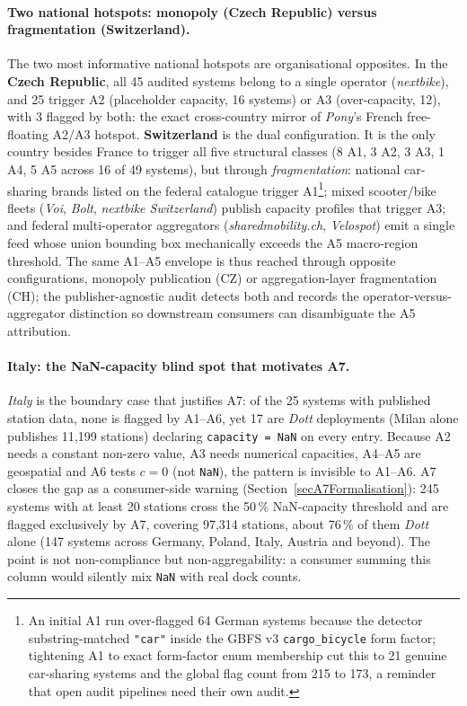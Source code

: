 \documentclass[11pt,a4paper]{article}
\begin{document}


\paragraph{Two national hotspots: monopoly (Czech Republic) versus fragmentation (Switzerland).}
The two most informative national hotspots are organisational
opposites. In the \textbf{Czech Republic}, all 45 audited systems
belong to a single operator (\emph{nextbike}), and 25 trigger A2
(placeholder capacity, 16 systems) or A3 (over-capacity, 12), with 3
flagged by both: the exact cross-country mirror of \emph{Pony}'s
French free-floating A2/A3 hotspot. \textbf{Switzerland} is the dual
configuration. It is the only country besides France to trigger all
five structural classes (8 A1, 3 A2, 3 A3, 1 A4, 5 A5 across 16 of 49
systems), but through \emph{fragmentation}: national car-sharing
brands listed on the federal catalogue trigger A1\footnote{An initial
A1 run over-flagged 64 German systems because the detector
substring-matched \texttt{"car"} inside the GBFS v3
\texttt{cargo\_bicycle} form factor; tightening A1 to exact
form-factor enum membership cut this to 21 genuine car-sharing systems
and the global flag count from 215 to 173, a reminder that open audit
pipelines need their own audit.}; mixed scooter/bike fleets
(\emph{Voi}, \emph{Bolt}, \emph{nextbike Switzerland}) publish
capacity profiles that trigger A3; and federal multi-operator
aggregators (\emph{sharedmobility.ch}, \emph{Velospot}) emit a single
feed whose union bounding box mechanically exceeds the A5
macro-region threshold. The same A1--A5 envelope is thus reached
through opposite configurations, monopoly publication (CZ) or
aggregation-layer fragmentation (CH); the publisher-agnostic audit
detects both and records the operator-versus-aggregator distinction
so downstream consumers can disambiguate the A5 attribution.

\paragraph{Italy: the NaN-capacity blind spot that motivates A7.}
\emph{Italy} is the boundary case that justifies A7: of the 25
systems with published station data, none is flagged by A1--A6, yet
17 are \emph{Dott} deployments (Milan alone publishes 11{,}199
stations) declaring \texttt{capacity = NaN} on every entry. Because
A2 needs a constant non-zero value, A3 needs numerical capacities,
A4--A5 are geospatial and A6 tests $c = 0$ (not \texttt{NaN}), the
pattern is invisible to A1--A6. A7 closes the gap as a consumer-side
warning (Section~\ref{secA7Formalisation}): 245 systems with
at least 20 stations cross the 50\,\% NaN-capacity threshold and are
flagged exclusively by A7, covering 97{,}314 stations, about
76\,\% of them \emph{Dott} alone (147 systems across Germany, Poland,
Italy, Austria and beyond). The point is not non-compliance but
non-aggregability: a consumer summing this column would silently mix
\texttt{NaN} with real dock counts.
\end{document}

